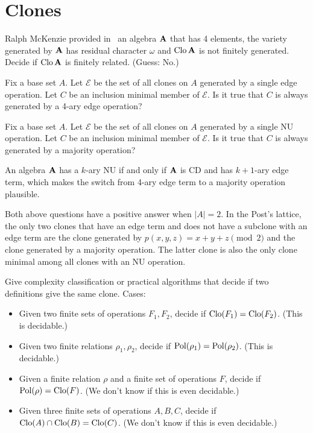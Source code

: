 \section{Clones}
\begin{question} Ralph McKenzie provided
  in~\cite{mckenzie-residual-bounds} an algebra
  ${\mathbf{A}}$ that has 4 elements, the variety generated by ${\mathbf{A}}$ has residual
  character $\omega$ and $\operatorname{Clo} {\mathbf{A}}$ is not finitely generated. Decide if
  $\operatorname{Clo} {\mathbf{A}}$ is finitely related. (Guess: No.)
\end{question}

\begin{question} Fix a base set $A$. Let $\mathcal E$ 
  be the set of all clones on $A$ generated by a single edge operation. Let $C$
  be an inclusion minimal member of $\mathcal E$. Is it true that $C$ is always
  generated by a 4-ary edge operation?
\end{question}
\begin{question} Fix a base set $A$. Let $\mathcal E$ 
  be the set of all clones on $A$ generated by a single NU operation. Let $C$
  be an inclusion minimal member of $\mathcal E$. Is it true that $C$ is always
  generated by a majority operation?
\end{question}

\begin{context}
  An algebra ${\mathbf{A}}$ has a $k$-ary NU if and only if ${\mathbf{A}}$ is CD and has
  $k+1$-ary edge term, which makes the switch from 4-ary edge term to a
  majority operation plausible.

  Both above questions have a positive answer when $|A|=2$. In the Post's
  lattice, the only two clones that have an edge term and does not have a subclone
  with an edge term are the clone generated by $p(x,y,z)=x+y+z\pmod 2$ and the
  clone generated by a majority operation. The latter clone is also the only
  clone minimal among all clones with an NU operation.
\end{context}

\begin{question}
  Give complexity classification or practical algorithms that decide if two definitions give the same clone. Cases:
  \begin{itemize}
    \item Given two finite sets of operations $F_1, F_2$, decide if
      $\operatorname{Clo}(F_1)=\operatorname{Clo}(F_2)$. (This is decidable.)
    \item Given two finite relations $\rho_1, \rho_2$, decide if
      $\operatorname{Pol}(\rho_1)=\operatorname{Pol}(\rho_2)$. (This is decidable.)
    \item Given a finite relation $\rho$ and a finite set of operations $F$,
      decide if $\operatorname{Pol}(\rho)=\operatorname{Clo}(F)$. (We don't know if this is even
      decidable.)
    \item Given three finite sets of operations $A, B, C$, decide if 
      $\operatorname{Clo}(A)\cap \operatorname{Clo}(B)=\operatorname{Clo}(C)$. (We don't know if this is even
      decidable.)
  \end{itemize}
\end{question}

